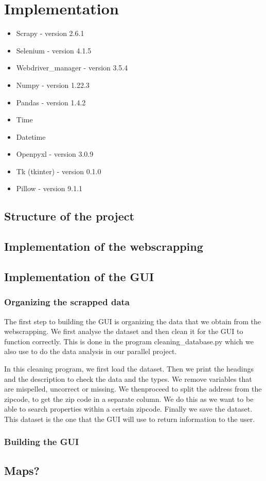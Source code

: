 \documentclass[main]{subfiles}
\begin{document}
\section{Implementation}
\begin{itemize}
    \item Scrapy -  version 2.6.1
    \item Selenium - version 4.1.5
    \item Webdriver\_manager - version 3.5.4
    \item Numpy -  version 1.22.3
    \item Pandas  - version 1.4.2
    \item Time
    \item Datetime
    \item Openpyxl - version 3.0.9
    \item Tk (tkinter) - version 0.1.0
    \item Pillow - version 9.1.1
\end{itemize}

\subsection{Structure of the project}

\subsection{Implementation of the webscrapping}

\subsection{Implementation of the GUI}

\subsubsection{Organizing the scrapped data}
The first step to building the GUI is organizing the data that we obtain from the webscrapping.
We first analyse the dataset and then clean it for the GUI to function correctly.
This is done in the program cleaning_database.py which we also use to do the data analysis in our parallel project. \par
In this cleaning program, we first load the dataset. 
Then we print the headings and the description to check the data and the types.
We remove variables that are mispelled, uncorrect or missing. 
We thenproceed to split the address from the zipcode, to get the zip code in a separate column. 
We do this as we want to be able to search properties within a certain zipcode. 
Finally we save the dataset. This dataset is the one that the GUI will use to return information to the user.

\subsubsection{Building the GUI}

\subsection{Maps?}
\end{document}

